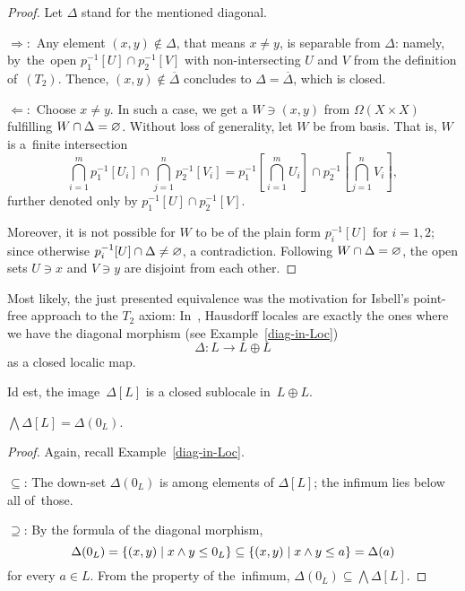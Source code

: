 \begin{proof}
  Let $\Delta$ stand for the mentioned diagonal.

  $\Rightarrow:$ Any element $(x, y)\not\in \Delta$, that means $x \ne y$, is
  separable from $\Delta$:
  namely, by~the~open $p_1^{-1}[U] \cap p_2^{-1}[V]$ with non-intersecting $U$
  and $V$ from the definition of~$(T_2)$.
  Thence, $(x, y)\not\in \overline{\Delta}$ concludes to $\Delta =
  \overline{\Delta}$, which is closed.

  $\Leftarrow:$ Choose $x \ne y$.
  In such a case, we get a $W\owns (x, y)$ from $\Omega(X\times X)$ fulfilling
  $W \cap \Delta = \varnothing$.
  Without loss of generality, let $W$ be from basis.
  That is, $W$ is a~finite intersection
  \[
    \bigcap_{i=1}^m p_1^{-1}[U_i] \cap \bigcap_{j=1}^n p_2^{-1}[V_i] =
    p_1^{-1}[\bigcap_{i=1}^m U_i] \cap p_2^{-1}[\bigcap_{j=1}^n V_i],
  \]
  further denoted only by $p_1^{-1}[U] \cap p_2^{-1}[V]$.

  Moreover, it is not possible for $W$ to be of the plain form $p_i^{-1}[U]$
  for $i = 1, 2$;
  since otherwise $p_i^{-1}[U] \cap \Delta \ne \varnothing$, a contradiction.
  Following $W \cap \Delta = \varnothing$, the open sets $U\owns x$ and $V\owns y$
  are disjoint from each other.
\end{proof}

Most likely, the just presented equivalence was the motivation for Isbell's
point-free approach to the $T_2$ axiom:
In~\cite{isbell72}, Hausdorff locales are exactly the ones where we have the
diagonal morphism (see Example~\ref{diag-in-Loc})
\[
  \Delta\colon L \to L \oplus L
\]
as a closed localic map.

Id est, the image~$\Delta[L]$ is a closed sublocale in~$L \oplus L$.

\begin{lem}
  $\bigwedge \Delta[L] = \Delta(0_L)$.
\end{lem}

\begin{proof}
  Again, recall Example~\ref{diag-in-Loc}\thinspace.

  $\subseteq$: The down-set $\Delta(0_L)$ is among elements of $\Delta[L]$; the
  infimum lies below all of~those.

  $\supseteq$: By the formula of the diagonal morphism,
  \[
    \Delta(0_L)
    = \left\{(x, y) \mid x \wedge y \leq 0_L \right\}
    \subseteq \left\{(x, y) \mid x \wedge y \leq a \right\}
    = \Delta(a)
  \]
  for every $a\in L$.
  From the property of the~infimum, $\Delta(0_L) \subseteq \bigwedge
  \Delta[L]$.
\end{proof}

